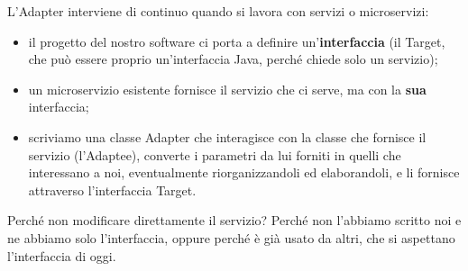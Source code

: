 L'Adapter interviene di continuo quando si lavora con servizi o microservizi:
\begin{itemize}
  \item il progetto del nostro software ci porta a definire un'\textbf{interfaccia} (il Target, che può essere proprio
        un'interfaccia Java, perché chiede solo un servizio);
  \item un microservizio esistente fornisce il servizio che ci serve, ma con la \textbf{sua} interfaccia;
  \item scriviamo una classe Adapter che interagisce con la classe che fornisce il servizio (l'Adaptee), converte i
        parametri da lui forniti in quelli che interessano a noi, eventualmente riorganizzandoli ed elaborandoli, e li
        fornisce attraverso l'interfaccia Target.
\end{itemize}
Perché non modificare direttamente il servizio? Perché non l'abbiamo scritto noi e ne abbiamo solo l'interfaccia, oppure
perché è già usato da altri, che si aspettano l'interfaccia di oggi.

